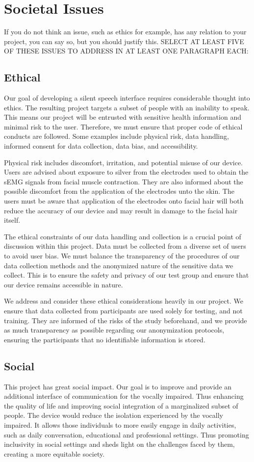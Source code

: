 \chapter{Societal Issues}
If you do not think an issue, such as ethics for example, has any relation to your project, you can say so, but you should justify this. SELECT AT LEAST FIVE OF THESE ISSUES TO ADDRESS IN AT LEAST ONE PARAGRAPH EACH:

\section{Ethical}
Our goal of developing a silent speech interface requires considerable thought into ethics.
The resulting project targets a subset of people with an inability to speak. This means our project
 will be entrusted with sensitive health information and minimal risk to the user. Therefore, we must
ensure that proper code of ethical conducts are followed. Some examples include physical risk, data 
handling, informed consent for data collection, data bias, and accessibility.

Physical risk includes discomfort, irritation, and potential misuse of our device. Users are advised about
 exposure to silver from the electrodes used to obtain the sEMG signals from facial muscle contraction. They are also
 informed about the possible discomfort from the application of the electrodes unto the skin. The users must be aware
 that application of the electrodes onto facial hair will both reduce the accuracy of our device and may result in 
 damage to the facial hair itself.

The ethical constraints of our data handling and collection is a crucial point of discussion within this project.
 Data must be collected from a diverse set of users to avoid user bias. We must balance the transparency of the procedures 
 of our data collection methods and the anonymized nature of the sensitive data we collect. This is to ensure the safety and privacy
 of our test group and ensure that our device remains accessible in nature.

We address and consider these ethical considerations heavily in our project. We ensure that data collected from participants are used
 solely for testing, and not training. They are informed of the risks of the study beforehand, and we provide as much transparency as
 possible regarding our anonymization protocols, ensuring the participants that no identifiable information is stored.

\section{Social}
This project has great social impact. Our goal is to improve and provide an additional interface of communication for the vocally impaired.
 Thus enhancing the quality of life and improving social integration of a marginalized subset of people. The device would reduce the isolation
 experienced by the vocally impaired. It allows those individuals to more easily engage in daily activities, such as daily conversation, educational and professional settings. 
 Thus promoting inclusivity in social settings and sheds light on the challenges faced by them, creating a more equitable society.

